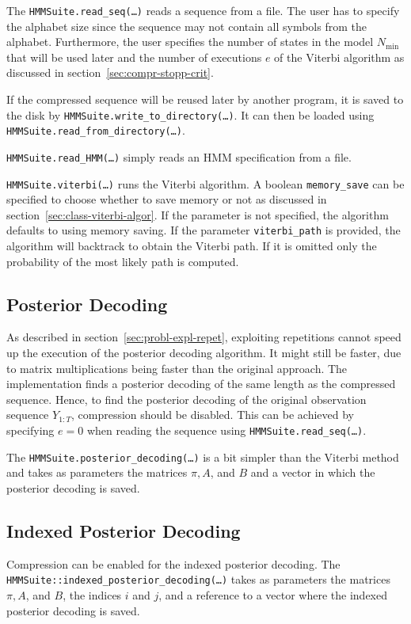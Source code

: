 The \texttt{HMMSuite.read\_seq(\dots)} reads a sequence from a file. The user
has to specify the alphabet size since the sequence may not contain all
symbols from the alphabet. Furthermore, the user specifies the number of states
in the model $N_{\min}$ that will be used later and the number of executions
$e$ of the Viterbi algorithm as discussed in
section~\ref{sec:compr-stopp-crit}.

If the compressed sequence will be reused later by another program, it is saved
to the disk by \texttt{HMMSuite.write\_to\_directory(\dots)}. It can then be
loaded using \texttt{HMMSuite.read\_from\_directory(\dots)}.

\texttt{HMMSuite.read\_HMM(\dots)} simply reads an HMM specification from a
file.

\texttt{HMMSuite.viterbi(\dots)} runs the Viterbi algorithm. A boolean
\texttt{memory\_save} can be specified to choose whether to save memory or not
as discussed in section~\ref{sec:class-viterbi-algor}. If the parameter is not
specified, the algorithm defaults to using memory saving. If the parameter
\texttt{viterbi\_path} is provided, the algorithm will backtrack to obtain the
Viterbi path. If it is omitted only the probability of the most likely path is
computed.

\subsection{Posterior Decoding}

As described in section~\ref{sec:probl-expl-repet}, exploiting repetitions
cannot speed up the execution of the posterior decoding algorithm. It might still
be faster, due to matrix multiplications being faster than the original
approach. The implementation finds a posterior decoding of the same length as
the compressed sequence. Hence, to find the posterior decoding of the original
observation sequence $Y_{1:T}$, compression should be disabled. This can be achieved by
specifying $e = 0$ when reading the sequence using
\texttt{HMMSuite.read\_seq(\dots)}.

The \texttt{HMMSuite.posterior\_decoding(\dots)} is a bit simpler than the
Viterbi method and takes as parameters the matrices $\pi, A$, and $B$ and a
vector in which the posterior decoding is saved.

\subsection{Indexed Posterior Decoding}

Compression can be enabled for the indexed posterior decoding. The
\texttt{HMMSuite::indexed\_posterior\_decoding(\dots)} takes as parameters the
matrices $\pi, A$, and $B$, the indices $i$ and $j$, and a reference to a vector
where the indexed posterior decoding is saved.

